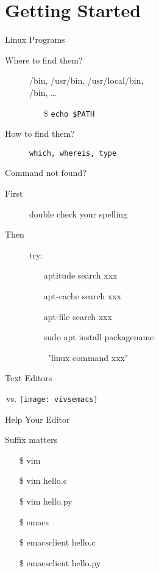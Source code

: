 \section{Getting Started}
\label{sec:start}

\begin{frame}{Linux Programs}
  \begin{description}
  \item[Where to find them?] {\ttfamily /bin, /usr/bin, /usr/local/bin,\\/bin,
      \ldots}
    \begin{itemize}
    \item[\$] \texttt{echo \$PATH}
    \end{itemize}
  \item[How to find them?] \texttt{which, whereis, type}
  \end{description}
  \begin{block}{Command not found?}
    \begin{description}
    \item[First] double check your spelling
    \item[Then] try:{\ttfamily
      \begin{itemize}
      \item[\debian] aptitude search xxx
      \item[\debian] apt-cache search xxx
      \item[\debian] apt-file search xxx
      \item[\debian] sudo apt install packagename
      \item[\GG] \google~"linux command xxx"
      \end{itemize}}
    \end{description}
  \end{block}
\end{frame}

\begin{frame}{Text Editors}
  \begin{block}{{\Huge\vim}\,\quad{}vs.\quad{}{\LARGE\emacs}}
    \texttt{[image: vivsemacs]}
  \end{block}
\end{frame}

\begin{frame}{Help Your Editor}
  \begin{block}{Suffix matters}\ttfamily
    \begin{itemize}
    \item[\$] vim \wrong
    \item[\$] vim hello.c  \correct
    \item[\$] vim hello.py \correct
    \item[\$] emacs \wrong
    \item[\$] emacsclient hello.c  \correct
    \item[\$] emacsclient hello.py \correct
    \end{itemize}
  \end{block}
\end{frame}


